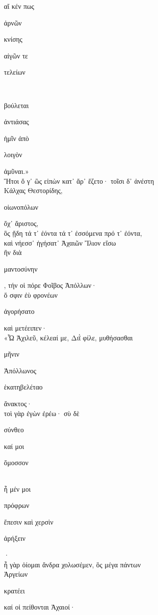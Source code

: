 \documentclass{ransom}
\begin{document}
\renewcommand{\rightheaderwhat}{\rightheaderwhatglosses}%
\begin{foreignpage}
\begin{graytext}
αἴ κέν πως \begin{whitetext}ἀρνῶν\end{whitetext} \begin{whitetext}κνίσης\end{whitetext} αἰγῶν τε \begin{whitetext}τελείων\end{whitetext}\\
\begin{whitetext}βούλεται\end{whitetext} \begin{whitetext}ἀντιάσας\end{whitetext} ἡμῖν ἀπὸ \begin{whitetext}λοιγὸν\end{whitetext} ἀμῦναι.»\\
Ἤτοι ὅ γ᾽ ὣς εἰπὼν κατ᾽ ἄρ᾽ ἕζετο· τοῖσι δ᾽ ἀνέστη\\
Κάλχας Θεστορίδης, \begin{whitetext}οἰωνοπόλων\end{whitetext} ὄχ᾽ ἄριστος,\\
ὃς ᾔδη τά τ᾽ ἐόντα τά τ᾽ ἐσσόμενα πρό τ᾽ ἐόντα,\hfill{}\\
καὶ νήεσσ᾽ ἡγήσατ᾽ Ἀχαιῶν Ἴλιον εἴσω\\
ἣν διὰ \begin{whitetext}μαντοσύνην\end{whitetext}, τήν οἱ πόρε Φοῖβος Ἀπόλλων·\\
ὅ σφιν ἐὺ φρονέων \begin{whitetext}ἀγορήσατο\end{whitetext} καὶ μετέειπεν·\\
«Ὦ Ἀχιλεῦ, κέλεαί με, Διῒ φίλε, μυθήσασθαι\\
\begin{whitetext}μῆνιν\end{whitetext} Ἀπόλλωνος \begin{whitetext}ἑκατηβελέταο\end{whitetext} ἄνακτος·\hfill{}\\
τοὶ γὰρ ἐγὼν ἐρέω· σὺ δὲ \begin{whitetext}σύνθεο\end{whitetext} καί μοι \begin{whitetext}ὄμοσσον\end{whitetext}\\
ἦ μέν μοι \begin{whitetext}πρόφρων\end{whitetext} ἔπεσιν καὶ χερσὶν \begin{whitetext}ἀρήξειν\end{whitetext}·\\
ἦ γὰρ ὀίομαι ἄνδρα χολωσέμεν, ὃς μέγα πάντων\\
Ἀργείων \begin{whitetext}κρατέει\end{whitetext} καί οἱ πείθονται Ἀχαιοί·\\


\end{graytext}
\end{foreignpage}
\end{document}
